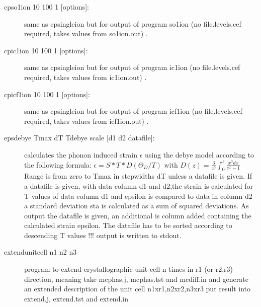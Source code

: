 \begin{description}
\item [\prg cpso1ion 10 100 1 {[options]}: ] same as {\prg cpsingleion} but for output of program
so1ion (no file.levels.cef required, takes values from so1ion.out) .
\item[\prg cpic1ion 10 100 1 {[options]}:] same as {\prg cpsingleion} but for output of program
ic1ion (no file.levels.cef required, takes values from ic1ion.out) .
\item[\prg cpicf1ion 10 100 1 {[options]}:] same as {\prg cpsingleion} but for output of program
icf1ion (no file.levels.cef required, takes values from icf1ion.out) .
					  
\item [\prg epsdebye Tmax dT Tdebye scale {[d1 d2 datafile]}:]	        
		    calculates the phonon induced strain $\epsilon$ using the debye model
		    according to the following formula:
		    $   \epsilon=S*T*D(\Theta_{D}/T) $
				    with    
		    $D(z)=\frac{3}{z^3}\int_0^z \frac{x^3 dx}{e^x-1}$
                 Range is from zero to Tmax in stepwidths dT
		 unless a datafile is given. 
                 If a  datafile is given, with data column d1 and d2,the strain
                 is calculated for T-values of data column d1 and epsilon
		  is compared to data in column d2 - a standard 
                 deviation sta is calculated as a sum of squared deviations.
                 As output the datafile is given, an additional is column added 
		 containing the calculated strain epsilon. The datafile has to
		 be sorted according to descending T values !!!
                 output is written to stdout.
\item [\prg extendunitcell n1 n2 n3]program to extend crystallographic %
unit cell n 
                times in r1 (or r2,r3) direction, meaning take mcphas.j, mcphas.tst 
                and mcdiff.in and generate an extended description of the unit %
cell 
                n1xr1,n2xr2,n3xr3 put result into extend.j, extend.tst and extend.in


\end{description}
